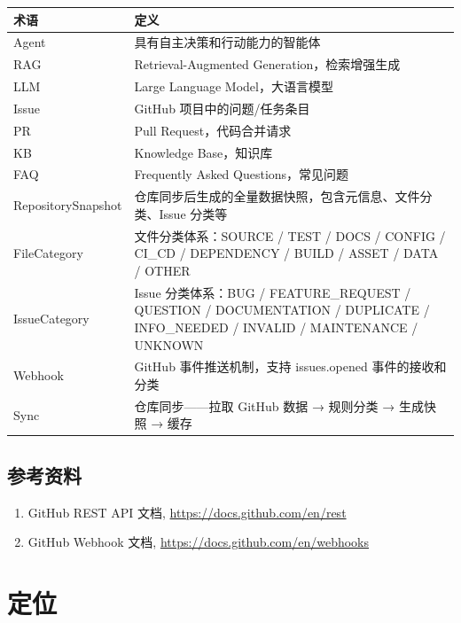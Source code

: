 \documentclass[10pt,a4paper]{article}
\newenvironment{ieeetable}{\begin{center}}{\end{center}}
\begin{document}
\begin{ieeetable}
    \begin{tabularx}{\textwidth}{L{3.5cm} X}
        \toprule
        \textbf{术语} & \textbf{定义} \\
        \midrule
        Agent & 具有自主决策和行动能力的智能体 \\
        RAG & Retrieval-Augmented Generation，检索增强生成 \\
        LLM & Large Language Model，大语言模型 \\
        Issue & GitHub 项目中的问题/任务条目 \\
        PR & Pull Request，代码合并请求 \\
        KB & Knowledge Base，知识库 \\
        FAQ & Frequently Asked Questions，常见问题 \\
        RepositorySnapshot & 仓库同步后生成的全量数据快照，包含元信息、文件分类、Issue 分类等 \\
        FileCategory & 文件分类体系：SOURCE / TEST / DOCS / CONFIG / CI\_CD / DEPENDENCY / BUILD / ASSET / DATA / OTHER \\
        IssueCategory & Issue 分类体系：BUG / FEATURE\_REQUEST / QUESTION / DOCUMENTATION / DUPLICATE / INFO\_NEEDED / INVALID / MAINTENANCE / UNKNOWN \\
        Webhook & GitHub 事件推送机制，支持 issues.opened 事件的接收和分类 \\
        Sync & 仓库同步——拉取 GitHub 数据 → 规则分类 → 生成快照 → 缓存 \\
        \bottomrule
    \end{tabularx}
\end{ieeetable}

\subsection{参考资料}

\begin{enumerate}
    \item GitHub REST API 文档, \url{https://docs.github.com/en/rest}
    \item GitHub Webhook 文档, \url{https://docs.github.com/en/webhooks}
\end{enumerate}

\section{定位}
\end{document}
